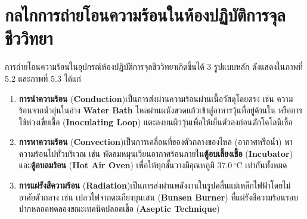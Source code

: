 \section{กลไกการถ่ายโอนความร้อนในห้องปฏิบัติการจุลชีววิทยา}


การถ่ายโอนความร้อนในอุปกรณ์ห้องปฏิบัติการจุลชีววิทยาเกิดขึ้นได้ 3 รูปแบบหลัก ดังแสดงใน\mbox{ภาพที่} 5.2 และ\mbox{ภาพที่} 5.3 ได้แก่
\begin{enumerate}
    \item \textbf{การนำความร้อน} (\textbf{Conduction})\quad เป็นการส่งผ่านความร้อนผ่านเนื้อวัสดุโดยตรง เช่น ความร้อนจากน้ำอุ่นในอ่าง \textbf{Water Bath} ไหลผ่านผนังขวดแก้วเข้าสู่อาหารวุ้นที่อยู่ด้านใน หรือการใช้ห่วงเขี่ยเชื้อ (\textbf{Inoculating Loop}) แตะลงบนผิววุ้นเพื่อให้เย็นตัวลงก่อนตักโคโลนีเชื้อ
    \item \textbf{การพาความร้อน} (\textbf{Convection})\quad เป็นการเคลื่อนที่ของตัวกลางของไหล (อากาศหรือน้ำ) พาความร้อนไปทั่วบริเวณ เช่น พัดลมหมุนเวียนอากาศร้อนภายใน\textbf{ตู้อบเลี้ยงเชื้อ} (\textbf{Incubator}) และ\textbf{ตู้อบลมร้อน} (\textbf{Hot Air Oven}) เพื่อให้ทุกชั้นวางมีอุณหภูมิ $37.0\,^\circ\text{C}$ เท่ากันทั้งหมด
    \item \textbf{การแผ่รังสีความร้อน} (\textbf{Radiation})\quad เป็นการส่งผ่านพลังงานในรูปคลื่นแม่เหล็กไฟฟ้าโดยไม่อาศัยตัวกลาง เช่น เปลวไฟจากตะเกียงบุนเสน (\textbf{Bunsen Burner}) ที่แผ่รังสีความร้อนรอบปากหลอดทดลองขณะเทคนิคปลอดเชื้อ (\textbf{Aseptic Technique})
\end{enumerate}

